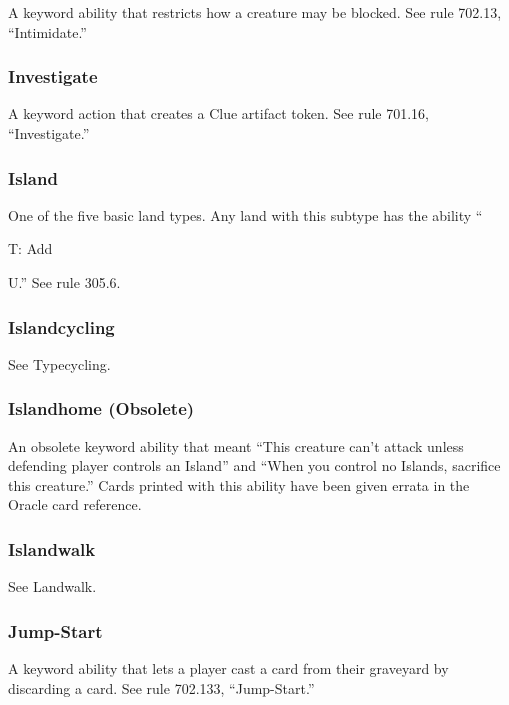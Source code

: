 {{{{{{{{{{{{{{{{{A keyword ability that restricts how a creature may be blocked. See rule 702.13, “Intimidate.”

\subsubsection*{Investigate}

A keyword action that creates a Clue artifact token. See rule 701.16, “Investigate.”

\subsubsection*{Island}

One of the five basic land types. Any land with this subtype has the ability “{T: Add {U.” See rule 305.6.

\subsubsection*{Islandcycling}

See Typecycling.

\subsubsection*{Islandhome (Obsolete)}

An obsolete keyword ability that meant “This creature can’t attack unless defending player controls an Island” and “When you control no Islands, sacrifice this creature.” Cards printed with this ability have been given errata in the Oracle card reference.

\subsubsection*{Islandwalk}

See Landwalk.

\subsubsection*{Jump-Start}

A keyword ability that lets a player cast a card from their graveyard by discarding a card. See rule 702.133, “Jump-Start.”

}}}}}}}}}}}}}}}}}}}
